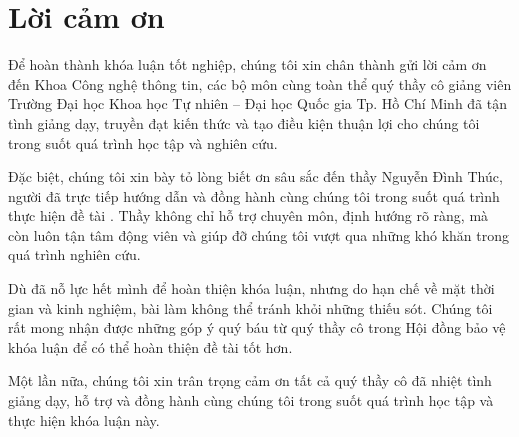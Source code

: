 \chapter*{Lời cảm ơn}

Để hoàn thành khóa luận tốt nghiệp, chúng tôi xin chân thành gửi lời cảm ơn đến Khoa Công nghệ thông tin, các bộ môn cùng toàn thể quý thầy cô giảng viên Trường Đại học Khoa học Tự nhiên -- Đại học Quốc gia Tp. Hồ Chí Minh 
đã tận tình giảng dạy, truyền đạt kiến thức và tạo điều kiện thuận lợi cho chúng tôi trong suốt quá trình học tập và nghiên cứu.

Đặc biệt, chúng tôi xin bày tỏ lòng biết ơn sâu sắc đến thầy Nguyễn Đình Thúc, người đã trực tiếp hướng dẫn và đồng hành cùng chúng tôi trong suốt quá trình thực hiện đề tài \textit{\thesisname}. 
Thầy không chỉ hỗ trợ chuyên môn, định hướng rõ ràng, mà còn luôn tận tâm động viên và giúp đỡ chúng tôi vượt qua những khó khăn trong quá trình nghiên cứu.

Dù đã nỗ lực hết mình để hoàn thiện khóa luận, nhưng do hạn chế về mặt thời gian và kinh nghiệm, bài làm không thể tránh khỏi những thiếu sót. 
Chúng tôi rất mong nhận được những góp ý quý báu từ quý thầy cô trong Hội đồng bảo vệ khóa luận để có thể hoàn thiện đề tài tốt hơn.

Một lần nữa, chúng tôi xin trân trọng cảm ơn tất cả quý thầy cô đã nhiệt tình giảng dạy, hỗ trợ và đồng hành cùng chúng tôi trong suốt quá trình học tập và thực hiện khóa luận này.